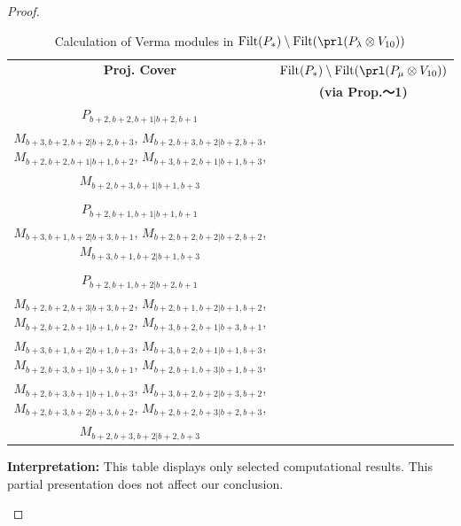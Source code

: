 \begin{proof}
\begin{enumerate}
\begin{enumerate}
\begin{table}[htbp]
\centering
\caption{Calculation of Verma modules in $\operatorname{Filt}(P_*) \setminus \operatorname{Filt}(\prl(P_\lambda \otimes V_{10})) $ } \label{tab:verma-analysis_c_10}
\begin{tabular}{cc}
\toprule
\textbf{Proj. Cover} & \textbf{$\operatorname{Filt}(P_*) \setminus \operatorname{Filt}(\prl(P_\mu \otimes V_{10})) $}  \\
     & \textbf{(via Prop.～1)}  \\
\midrule
 $P_{b+2,b+2,b+1|b+2,b+1}$ & \makecell{
 $M_{b+3,b+2,b+1|b+3,b+1}$,
 $M_{b+2,b+3,b+1|b+3,b+1}$,
 $M_{b+2,b+2,b+2|b+2,b+2}$,
 $M_{b+3,b+2,b+2|b+3,b+2}$, \\
 $M_{b+3,b+2,b+2|b+2,b+3}$,
 $M_{b+2,b+3,b+2|b+2,b+3}$,
 $M_{b+2,b+2,b+1|b+1,b+2}$,
 $M_{b+3,b+2,b+1|b+1,b+3}$, \\
 $M_{b+2,b+3,b+1|b+1,b+3}$
}\\
 & \\
 $P_{b+2,b+1,b+1|b+1,b+1}$ & \makecell{
 $M_{b+2,b+2,b+1|b+1,b+2}$,
 $M_{b+2,b+1,b+2|b+1,b+2}$,
 $M_{b+3,b+2,b+1|b+3,b+1}$,
 $M_{b+3,b+2,b+1|b+1,b+3}$, \\
 $M_{b+3,b+1,b+2|b+3,b+1}$,
 $M_{b+2,b+2,b+2|b+2,b+2}$,
 $M_{b+3,b+1,b+2|b+1,b+3}$
}\\
 & \\
 $P_{b+2,b+1,b+2|b+2,b+1}$ & \makecell{
 $M_{b+3,b+1,b+2|b+3,b+1}$,
 $M_{b+2,b+2,b+2|b+2,b+2}$,
 $M_{b+2,b+1,b+3|b+3,b+1}$,
 $M_{b+3,b+2,b+2|b+2,b+3}$, \\
 $M_{b+2,b+2,b+3|b+3,b+2}$,
 $M_{b+2,b+1,b+2|b+1,b+2}$,
 $M_{b+2,b+2,b+1|b+1,b+2}$,
 $M_{b+3,b+2,b+1|b+3,b+1}$, \\
 $M_{b+3,b+1,b+2|b+1,b+3}$,
 $M_{b+3,b+2,b+1|b+1,b+3}$,
 $M_{b+2,b+3,b+1|b+3,b+1}$,
 $M_{b+2,b+1,b+3|b+1,b+3}$, \\
 $M_{b+2,b+3,b+1|b+1,b+3}$,
 $M_{b+3,b+2,b+2|b+3,b+2}$,
 $M_{b+2,b+3,b+2|b+3,b+2}$,
 $M_{b+2,b+2,b+3|b+2,b+3}$, \\
 $M_{b+2,b+3,b+2|b+2,b+3}$
}\\
\bottomrule
\end{tabular}
\vspace{0.5em}
\parbox{\linewidth}{\small
\textbf{Interpretation:}
This table displays only selected computational results. This partial presentation does not affect our conclusion.
}
\end{table}
      \end{enumerate}


\end{enumerate}
\end{proof}
